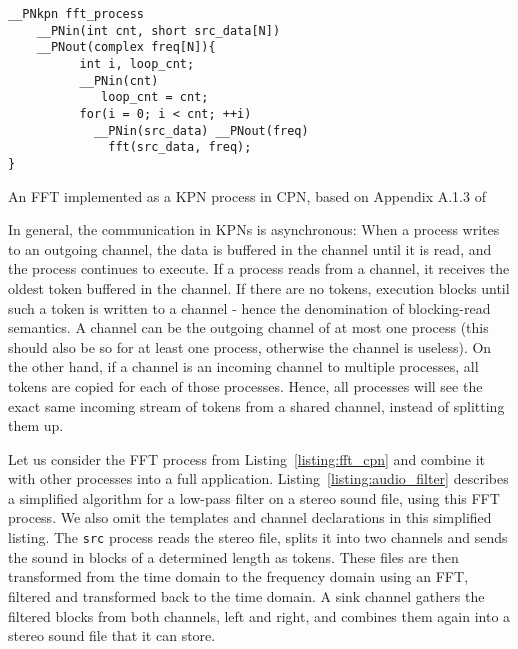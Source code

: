 \begin{listing}
\begin{verbatim}
__PNkpn fft_process
    __PNin(int cnt, short src_data[N])
    __PNout(complex freq[N]){
          int i, loop_cnt;
          __PNin(cnt)
             loop_cnt = cnt;
          for(i = 0; i < cnt; ++i)
            __PNin(src_data) __PNout(freq)
              fft(src_data, freq);
}
\end{verbatim}
\caption{An \ac{FFT} implemented as a \ac{KPN} process in \ac{CPN}, based on Appendix A.1.3 of \cite{castrillon2014thesis}}
\label{listing:fft_cpn}
\end{listing}


In general, the communication in \acp{KPN} is asynchronous: 
When a process writes to an outgoing channel, the data is buffered in the channel until it is read, and the process continues to execute.
If a process reads from a channel, it receives the oldest token buffered in the channel.
If there are no tokens, execution blocks until such a token is written to a channel - hence the denomination of blocking-read semantics.
A channel can be the outgoing channel of at most one process (this should also be so for at least one process, otherwise the channel is useless).
On the other hand, if a channel is an incoming channel to multiple processes, all tokens are copied for each of those processes.
Hence, all processes will see the exact same incoming stream of tokens from a shared channel, instead of splitting them up.

Let us consider the \acs{FFT} process from Listing~\ref{listing:fft_cpn} and combine it with other processes into a full application.
Listing~\ref{listing:audio_filter} describes a simplified algorithm for a low-pass filter on a stereo sound file, using this \acs{FFT} process.
We also omit the templates and channel declarations in this simplified listing.
The \texttt{src} process reads the stereo file, splits it into two channels and sends the sound in blocks of a determined length as tokens.
These files are then transformed from the time domain to the frequency domain using an \ac{FFT}, filtered and transformed back to the time domain.
A sink channel gathers the filtered blocks from both channels, left and right, and combines them again into a stereo sound file that it can store.

